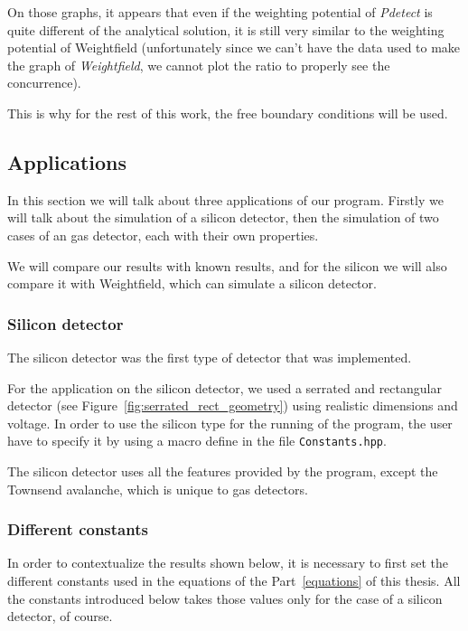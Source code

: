 \documentclass[11pt]{article}
\begin{document}
		On those graphs, it appears that even if the weighting potential of \textit{Pdetect} is quite
		different of the analytical solution, it is still very similar to the weighting potential
		of Weightfield (unfortunately since we can't have the data used to make the graph of
		\textit{Weightfield}, we cannot plot the ratio to properly see the concurrence).

		This is why for the rest of this work, the free boundary conditions will be used.

	\subsection{Applications}

		In this section we will talk about three applications of our program.
		Firstly we will talk about the simulation of a silicon detector, then the
		simulation of two cases of an gas detector, each with their own properties.

		We will compare our results with known results, and for the silicon we will also
		compare it with Weightfield, which can simulate a silicon detector.

		\subsubsection{Silicon detector}

			The silicon detector was the first type of detector that was implemented.

			For the application on the silicon detector, we used a serrated and rectangular detector
			(see Figure~\ref{fig:serrated_rect_geometry}) using realistic dimensions and voltage.
			In order to use the silicon type for the running of the program, the user have to specify
			it by using a macro define in the file \texttt{Constants.hpp}.

			The silicon detector uses all the features provided by the program, except the Townsend
			avalanche, which is unique to gas detectors.

			\subsubsection*{Different constants}

				In order to contextualize the results shown below, it is necessary to first set the
				different constants used in the equations of the Part~\ref{equations} of this thesis.
				All the constants introduced below takes those values only for the case of a silicon
				detector, of course.
\end{document}
